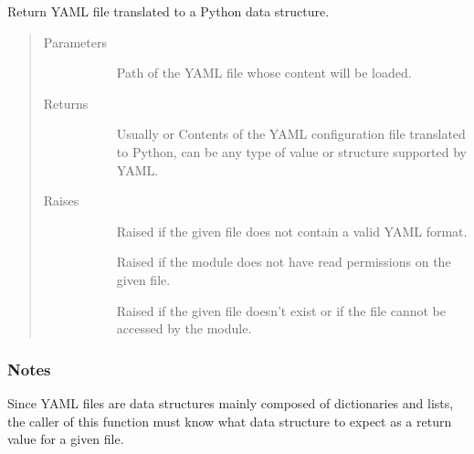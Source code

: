 \documentclass[letterpaper,10pt,english]{sphinxmanual}
\begin{document}
\begin{fulllineitems}
\label{\detokenize{yamlUtility:yamlUtility.getYamlContent}}
Return YAML file translated to a Python data structure.
\begin{quote}\begin{description}
\item[{Parameters}] \leavevmode\begin{description}
\item[{}] \leavevmode{[}\sphinxtitleref{str}{]}
Path of the YAML file whose content will be loaded.

\end{description}

\item[{Returns}] \leavevmode\begin{description}
\item[{}] \leavevmode{[}Usually  or \sphinxtitleref{list}{]}
Contents of the YAML configuration file translated to Python, can be any
type of value or structure supported by YAML.

\end{description}

\item[{Raises}] \leavevmode\begin{description}
\item[{}] \leavevmode
Raised if the given file does not contain a valid YAML format.

\item[{}] \leavevmode
Raised if the module does not have read permissions on the given file.

\item[{}] \leavevmode
Raised if the given file doesn’t exist or if the file cannot be accessed by
the module.

\end{description}

\end{description}\end{quote}
\subsubsection*{Notes}

Since YAML files are data structures mainly composed of dictionaries and lists,
the caller of this function must know what data structure to expect as a return
value for a given file.

\end{fulllineitems}
\end{document}

